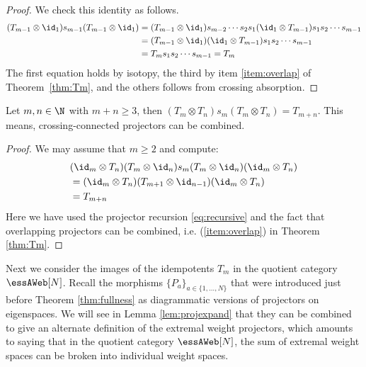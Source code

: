 \begin{proof} We check this identity as follows.
\begin{align*}
(T_{m-1}\otimes \id_1)s_{m-1}(T_{m-1}\otimes \id_1) &= (T_{m-1}\otimes \id_1)s_{m-2}\cdots s_{2}s_{1}(\id_1\otimes T_{m-1}) s_1 s_2 \cdots s_{m-1}\\ 
                                                    &= (T_{m-1}\otimes \id_1)(\id_1\otimes T_{m-1} ) s_1 s_2 \cdots s_{m-1}\\
  &= T_m s_1 s_2 \cdots s_{m-1} =T_m
\end{align*}
The first equation holds by isotopy, the third by item \eqref{item:overlap} of Theorem~\ref{thm:Tm}, and the others follows from crossing absorption.
\end{proof}


\begin{lemma}\label{lem:linkedproj} Let $m,n\in \N$ with $m+n\geq 3$, then $(T_m\otimes T_n)s_m(T_m\otimes T_n)=T_{m+n}$. This means, crossing-connected projectors can be combined. 
\end{lemma}
\begin{proof} We may assume that $m\geq 2$ and compute:
  \begin{align*}
    &(\id_m\otimes T_n)(T_m\otimes \id_n)s_m(T_m\otimes \id_n)(\id_m\otimes T_n) \\
    & = (\id_m\otimes T_n)(T_{m+1}\otimes \id_{n-1})(\id_m\otimes T_n) \\
                                                                               & = T_{m+n}
  \end{align*}
  Here we have used the projector recursion \eqref{eq:recursive} and the fact that overlapping projectors can be combined, i.e. (\ref{item:overlap}) in Theorem \ref{thm:Tm}.
\end{proof}

Next we consider the images of the idempotents $T_m$ in the quotient category
$\essAWeb[N]$. Recall the morphisms $\{P_a\}_{a\in \{1,\dots, N\}}$ that were
introduced just before Theorem \ref{thm:fullness} as diagrammatic versions of
projectors on eigenspaces. We will see in Lemma \ref{lem:projexpand} that they
can be combined to give an alternate definition of the extremal weight
projectors, which amounts to saying that in the quotient category $\essAWeb[N]$,
the sum of extremal weight spaces can be broken into individual weight spaces.

